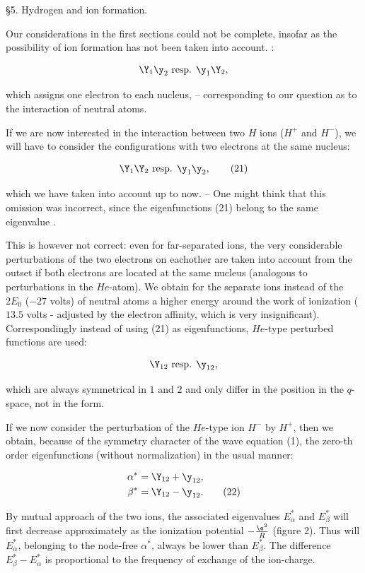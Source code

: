 \documentclass{article}
\newcommand{\nequ}[2]{
\begin{align*}
#1
\tag{#2}
\end{align*}
}
\newcommand{\uequ}[1]{
\begin{align*}
#1
\end{align*}
}
\begin{document}
§5. Hydrogen and ion formation.

Our considerations in the first sections could not be complete, insofar as the possibility of ion formation has not been taken into account. :
\uequ{
\Y_1 \y_2 \text{ resp. } \y_1 \Y_2,
}
which assigns one electron to each nucleus, -- corresponding to our question as to the interaction of neutral atoms.

If we are now interested in the interaction between two $H$ ions ($H^+$ and $H^-$), we will have to consider the configurations with two electrons at the same nucleus:
\nequ{
\Y_1\Y_2 \text{ resp. } \y_1\y_2,
}{21}
which we have taken into account up to now. -- One might think that this omission was incorrect, since the eigenfunctions (21) belong to the same eigenvalue .

This is however not correct: even for far-separated ions, the very considerable perturbations of the two electrons on eachother are taken into account from the outset if both electrons are located at the same nucleus (analogous to perturbations in the $He$-atom). We obtain for the separate ions instead of the $2E_0$ ($-27$ volts) of neutral atoms a higher energy around the work of ionization ($13.5$ volts - adjusted by the electron affinity, which is very insignificant). Correspondingly instead of using (21) as eigenfunctions, $He$-type perturbed functions are used:
\uequ{
\Y_{12} \text{ resp. } \y_{12},
}
which are always symmetrical in $1$ and $2$ and only differ in the position in the $q$-space, not in the form.

If we now consider the perturbation of the $He$-type ion $H^{-}$ by $H^{+}$, then we obtain, because of the symmetry character of the wave equation (1), the zero-th order eigenfunctions (without normalization) in the usual manner:
\nequ{
\alpha^* &= \Y_{12} + \y_{12},\\
\beta^*  &= \Y_{12} - \y_{12}.
}{22}

By mutual approach of the two ions, the associated eigenvalues $E_\alpha^*$ and $E_\beta^*$ will first decrease approximately as the ionization potential $-\frac{\e^2}{R}$ (figure 2). Thus will $E_\alpha^*$, belonging to the node-free $\alpha^*$, always be lower than $E_\beta^*$. The difference $E_\beta^* - E_\alpha^*$ is proportional to the frequency of exchange of the ion-charge.
\end{document}
